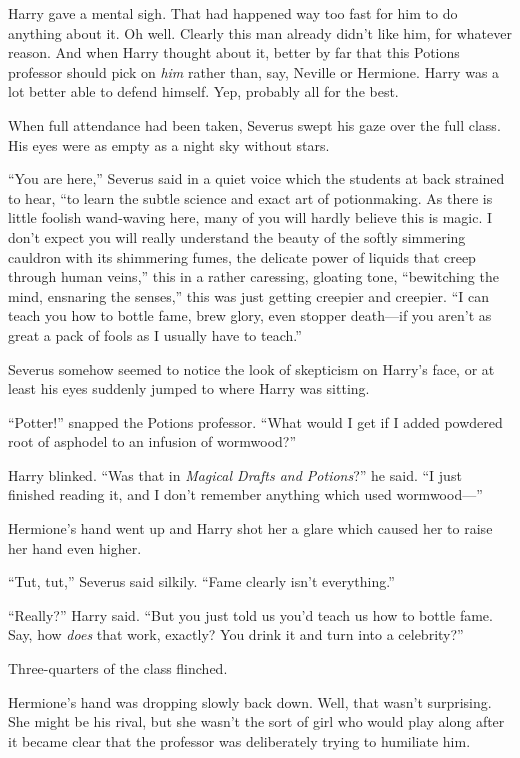 Harry gave a mental sigh. That had happened way too fast for him to do
anything about it. Oh well. Clearly this man already didn't like him,
for whatever reason. And when Harry thought about it, better by far that
this Potions professor should pick on \emph{him} rather than, say,
Neville or Hermione. Harry was a lot better able to defend himself. Yep,
probably all for the best.

When full attendance had been taken, Severus swept his gaze over the
full class. His eyes were as empty as a night sky without stars.

``You are here,'' Severus said in a quiet voice which the students at
back strained to hear, ``to learn the subtle science and exact art of
potionmaking. As there is little foolish wand-waving here, many of you
will hardly believe this is magic. I don't expect you will really
understand the beauty of the softly simmering cauldron with its
shimmering fumes, the delicate power of liquids that creep through human
veins,'' this in a rather caressing, gloating tone, ``bewitching the
mind, ensnaring the senses,'' this was just getting creepier and
creepier. ``I can teach you how to bottle fame, brew glory, even stopper
death---if you aren't as great a pack of fools as I usually have to
teach.''

Severus somehow seemed to notice the look of skepticism on Harry's face,
or at least his eyes suddenly jumped to where Harry was sitting.

``Potter!'' snapped the Potions professor. ``What would I get if I added
powdered root of asphodel to an infusion of wormwood?''

Harry blinked. ``Was that in \emph{Magical Drafts and Potions}?'' he
said. ``I just finished reading it, and I don't remember anything which
used wormwood---''

Hermione's hand went up and Harry shot her a glare which caused her to
raise her hand even higher.

``Tut, tut,'' Severus said silkily. ``Fame clearly isn't everything.''

``Really?'' Harry said. ``But you just told us you'd teach us how to
bottle fame. Say, how \emph{does} that work, exactly? You drink it and
turn into a celebrity?''

Three-quarters of the class flinched.

Hermione's hand was dropping slowly back down. Well, that wasn't
surprising. She might be his rival, but she wasn't the sort of girl who
would play along after it became clear that the professor was
deliberately trying to humiliate him.

